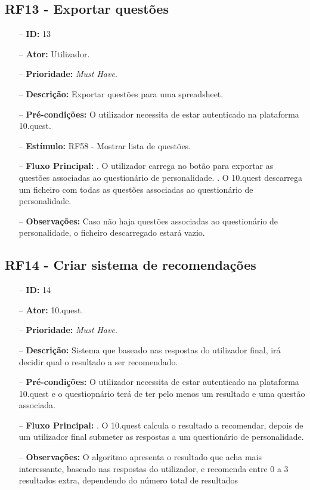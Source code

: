 \subsection{RF13 - Exportar questões}
\begin{itemize}
	\item[--] \textbf{ID:} 13
	\item[--]  \textbf{Ator:} Utilizador.
	\item[--]  \textbf{Prioridade:} \textit{Must Have}.
	\item[--]  \textbf{Descrição:} Exportar questões para uma spreadsheet.
	\item[--]  \textbf{Pré-condições:} O utilizador necessita de estar autenticado na plataforma 10.quest.
	\item[--]  \textbf{Estímulo:}  
		\subitem RF58 - Mostrar lista de questões.
	\item[--]  \textbf{Fluxo Principal:} 
		. O utilizador carrega no botão para exportar as questões associadas ao questionário de personalidade.
		. O 10.quest descarrega um ficheiro com todas as questões associadas ao questionário de personalidade.
	\item[--]  \textbf{Observações:} Caso não haja questões associadas ao questionário de personalidade, o ficheiro descarregado estará vazio.
\end{itemize}
\newpage

\subsection{RF14 - Criar sistema de recomendações}
\begin{itemize}
	\item[--] \textbf{ID:} 14
	\item[--]  \textbf{Ator:} 10.quest.
	\item[--]  \textbf{Prioridade:} \textit{Must Have}.
	\item[--]  \textbf{Descrição:} Sistema que baseado nas respostas do utilizador final, irá decidir qual o resultado a ser recomendado.
	\item[--]  \textbf{Pré-condições:}  O utilizador necessita de estar autenticado na plataforma 10.quest e o questiopnário terá de ter pelo menos um resultado e uma questão associada.
	\item[--]  \textbf{Fluxo Principal:} 
		. O 10.quest calcula o resultado a recomendar, depois de um utilizador final submeter as respostas a um questionário de personalidade.
	\item[--]  \textbf{Observações:} O algoritmo apresenta o resultado que acha mais interessante, baseado nas respostas do utilizador, e recomenda entre 0 a 3 resultados extra, dependendo do número total de resultados 
\end{itemize}
\newpage

